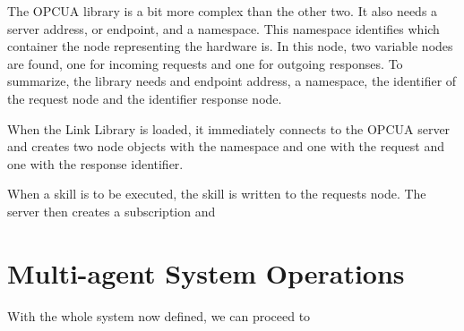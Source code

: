 
The \acrshort{OPCUA} library is a bit more complex than the other two. It also needs a server address, or endpoint, and a namespace. This namespace identifies which container the node representing the hardware is. In this node, two variable nodes are found, one for incoming requests and one for outgoing responses. To summarize, the library needs and endpoint address, a namespace, the identifier of the request node and the identifier response node.

When the Link Library is loaded, it immediately connects to the \acrshort{OPCUA} server and creates two node objects with the namespace and one with the request and one with the response identifier.

When a skill is to be executed, the skill is written to the requests node. The server then creates a subscription and 




\section{Multi-agent System Operations}
\label{sec:mas_operations}

With the whole system now defined, we can proceed to 